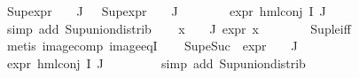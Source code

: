 \begin{isabellebody}
\ {\isachardoublequoteopen}Sup{\isacharparenleft}{\kern0pt}{\isacharparenleft}{\kern0pt}expr{\isacharunderscore}{\kern0pt}{}\ {\isasymcirc}\ {\isasymPhi}{\isacharparenright}{\kern0pt}\ {\isacharbackquote}{\kern0pt}\ J{\isacharparenright}{\kern0pt}\ {\isasymle}\ {}{\isachardoublequoteclose}\ {\isachardoublequoteopen}Sup{\isacharparenleft}{\kern0pt}{\isacharparenleft}{\kern0pt}expr{\isacharunderscore}{\kern0pt}{}\ {\isasymcirc}\ {\isasymPhi}{\isacharparenright}{\kern0pt}\ {\isacharbackquote}{\kern0pt}\ J{\isacharparenright}{\kern0pt}\ {\isasymle}\ {}{\isachardoublequoteclose}\isanewline
\ \ \ \ \isamarkupfalse%
\ {\isacartoucheopen}expr{\isacharunderscore}{\kern0pt}{}\ {\isacharparenleft}{\kern0pt}hml{\isacharunderscore}{\kern0pt}conj\ I\ J\ {\isasymPhi}{\isacharparenright}{\kern0pt}\ {\isasymle}\ {}{\isacartoucheclose}\isanewline
\ \ \ \ \isamarkupfalse%
\ {\isacharparenleft}{\kern0pt}simp\ add{\isacharcolon}{\kern0pt}\ Sup{\isacharunderscore}{\kern0pt}union{\isacharunderscore}{\kern0pt}distrib{\isacharparenright}{\kern0pt}{\isacharplus}{\kern0pt}\isanewline
\ \ \isamarkupfalse%
\ {\isachardoublequoteopen}{\isasymforall}x\ {\isasymin}\ {\isasymPhi}\ {\isacharbackquote}{\kern0pt}\ J{\isachardot}{\kern0pt}\ expr{\isacharunderscore}{\kern0pt}{}\ x\ {\isasymle}\ {}{\isachardoublequoteclose}\isanewline
\ \ \ \ \isamarkupfalse%
\ Sup{\isacharunderscore}{\kern0pt}le{\isacharunderscore}{\kern0pt}iff\isanewline
\ \ \ \ \isamarkupfalse%
\ {\isacharparenleft}{\kern0pt}metis\ image{\isacharunderscore}{\kern0pt}comp\ image{\isacharunderscore}{\kern0pt}eqI{\isacharparenright}{\kern0pt}\isanewline
\ \ \isamarkupfalse%
\ {\isachardoublequoteopen}Sup{\isacharparenleft}{\kern0pt}{\isacharparenleft}{\kern0pt}eSuc\ {\isasymcirc}\ expr{\isacharunderscore}{\kern0pt}{}\ {\isasymcirc}\ {\isasymPhi}{\isacharparenright}{\kern0pt}\ {\isacharbackquote}{\kern0pt}\ J{\isacharparenright}{\kern0pt}\ {\isacharless}{\kern0pt}{\isacharequal}{\kern0pt}\ {}{\isachardoublequoteclose}\isanewline
\ \ \ \ \isamarkupfalse%
\ {\isacartoucheopen}expr{\isacharunderscore}{\kern0pt}{}\ {\isacharparenleft}{\kern0pt}hml{\isacharunderscore}{\kern0pt}conj\ I\ J\ {\isasymPhi}{\isacharparenright}{\kern0pt}\ {\isasymle}\ {}{\isacartoucheclose}\isanewline
\ \ \ \ \isamarkupfalse%
\ {\isacharparenleft}{\kern0pt}simp\ add{\isacharcolon}{\kern0pt}\ Sup{\isacharunderscore}{\kern0pt}union{\isacharunderscore}{\kern0pt}distrib{\isacharparenright}{\kern0pt}\isanewline

\end{isabellebody}
